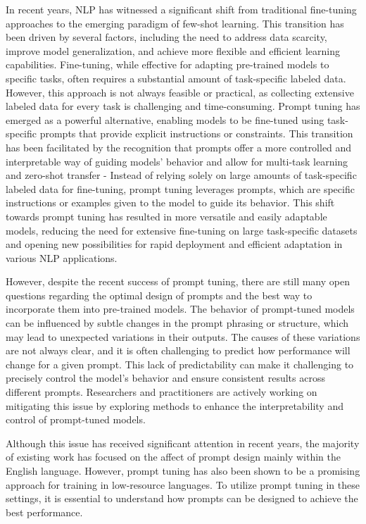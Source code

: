 In recent years, NLP
has witnessed a significant shift from 
traditional fine-tuning approaches to the 
emerging paradigm of few-shot learning. 
This transition has been 
driven by several factors, including the 
need to address data scarcity, 
improve model generalization, and 
achieve more flexible and efficient 
learning capabilities. Fine-tuning, 
while effective for adapting 
pre-trained models to specific 
tasks, often requires a substantial 
amount of task-specific labeled data. 
However, this approach is not always 
feasible or practical, as collecting 
extensive labeled data for every task is 
challenging and time-consuming. Prompt tuning has 
emerged as a powerful alternative, 
enabling models to be fine-tuned using 
task-specific prompts that provide explicit 
instructions or constraints.
This transition has been facilitated 
by the recognition that prompts offer a more 
controlled and interpretable way of guiding models'
behavior and allow for multi-task learning and zero-shot 
transfer -
Instead of relying solely on large amounts 
of task-specific labeled data for fine-tuning, prompt 
tuning leverages prompts, which are specific 
instructions or examples given to the model to guide 
its behavior.
This shift towards prompt tuning has resulted in more 
versatile and easily adaptable models, reducing the 
need for extensive fine-tuning on large task-specific 
datasets and opening new possibilities for rapid 
deployment and efficient adaptation in various NLP 
 applications.

However, despite the recent success of prompt tuning,
there are still many open questions regarding the
optimal design of prompts and the best way to
incorporate them into pre-trained models.
The behavior of prompt-tuned models can be 
influenced by subtle changes in the prompt 
phrasing or structure, which may lead to 
unexpected variations in their outputs.
The causes of these variations are not always
clear, and it is often challenging to predict
how performance will change for a given prompt.
This lack of predictability can make it challenging to 
precisely control the model's behavior and ensure 
consistent results across different prompts. 
Researchers and practitioners are 
actively working on mitigating this issue by 
exploring methods to enhance the interpretability and 
control of prompt-tuned models. 

Although this issue has received significant attention
in recent years,
the majority of existing work has
focused on the affect of prompt design mainly within
the English language.
However, prompt tuning has also been shown to be
a promising approach for training
in low-resource languages.
To utilize prompt tuning in these settings,
it is essential to understand how prompts
can be designed to achieve the best performance.

